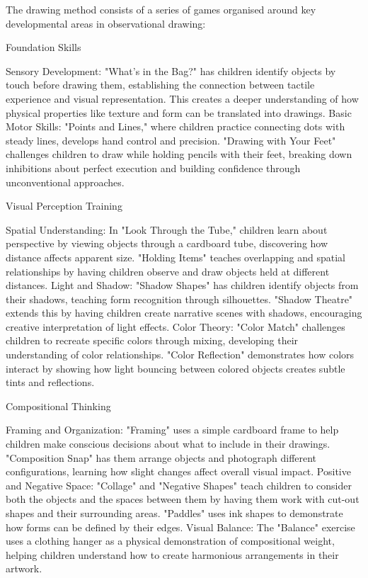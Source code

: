 \documentclass{article}
\begin{document}
The drawing method consists of a series of games organised around key developmental areas in observational drawing:

Foundation Skills

Sensory Development: "What's in the Bag?" has children identify objects by touch before drawing them, establishing the connection between tactile experience and visual representation. This creates a deeper understanding of how physical properties like texture and form can be translated into drawings.
Basic Motor Skills: "Points and Lines," where children practice connecting dots with steady lines, develops hand control and precision. "Drawing with Your Feet" challenges children to draw while holding pencils with their feet, breaking down inhibitions about perfect execution and building confidence through unconventional approaches.


Visual Perception Training

Spatial Understanding: In "Look Through the Tube," children learn about perspective by viewing objects through a cardboard tube, discovering how distance affects apparent size. "Holding Items" teaches overlapping and spatial relationships by having children observe and draw objects held at different distances.
Light and Shadow: "Shadow Shapes" has children identify objects from their shadows, teaching form recognition through silhouettes. "Shadow Theatre" extends this by having children create narrative scenes with shadows, encouraging creative interpretation of light effects.
Color Theory: "Color Match" challenges children to recreate specific colors through mixing, developing their understanding of color relationships. "Color Reflection" demonstrates how colors interact by showing how light bouncing between colored objects creates subtle tints and reflections.


Compositional Thinking

Framing and Organization: "Framing" uses a simple cardboard frame to help children make conscious decisions about what to include in their drawings. "Composition Snap" has them arrange objects and photograph different configurations, learning how slight changes affect overall visual impact.
Positive and Negative Space: "Collage" and "Negative Shapes" teach children to consider both the objects and the spaces between them by having them work with cut-out shapes and their surrounding areas. "Paddles" uses ink shapes to demonstrate how forms can be defined by their edges.
Visual Balance: The "Balance" exercise uses a clothing hanger as a physical demonstration of compositional weight, helping children understand how to create harmonious arrangements in their artwork.
\end{document}
